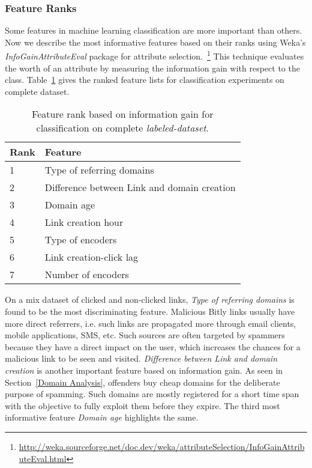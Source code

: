 \documentclass[conference]{IEEEtran}
\begin{document}
\subsubsection{Feature Ranks}
Some features in machine learning classification are more important than others. Now we describe the most informative features based on their ranks using Weka's \textit{InfoGainAttributeEval} package for attribute selection.~\footnote{\url{http://weka.sourceforge.net/doc.dev/weka/attributeSelection/InfoGainAttributeEval.html}} This technique evaluates the worth of an attribute by measuring the information gain with respect to the class. Table~\ref{tb:featureRank} gives the ranked feature lists for classification experiments on complete dataset. 
\begin{table}[ht]
\small
\centering
\begin{tabular}{|l|l|}\hline
\small
\textbf{Rank} & \textbf{Feature}\\ \hline
1 & Type of referring domains\\ \hline
2 & Difference between Link and domain creation\\ \hline
3 & Domain age\\ \hline
4 & Link creation hour\\ \hline
5 & Type of encoders \\ \hline
6 & Link creation-click lag \\ \hline
7 & Number of encoders \\ \hline
\end{tabular}
\caption{\label{tb:featureRank} Feature rank based on information gain for classification on complete \textit{labeled-dataset}.}
\end{table}
On a mix dataset of clicked and non-clicked links, \textit{Type of referring domains} is found to be the most discriminating feature. Malicious Bitly links usually have more direct referrers, i.e. such links are propagated more through email clients, mobile applications, SMS, etc. Such sources are often targeted by spammers because they have a direct impact on the user, which increases the chances for a malicious link to be seen and visited. \textit{Difference between Link and domain creation} is another important feature based on information gain. As seen in Section~\ref{Domain Analysis}, offenders buy cheap domains for the deliberate purpose of spamming. Such domains are mostly registered for a short time span with the objective to fully exploit them before they expire. The third most informative feature \textit{Domain age} highlights the same. 
\end{document}
